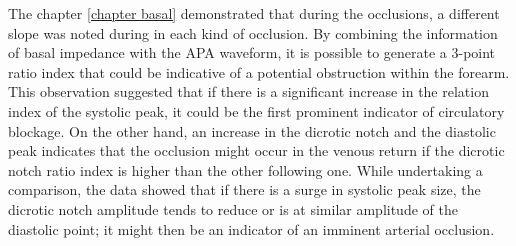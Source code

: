 The chapter \ref{chapter basal} demonstrated that during the occlusions, a different slope was noted during in each kind of occlusion. By combining the information of basal impedance with the APA waveform, it is possible to generate a 3-point ratio index that could be indicative of a potential obstruction within the forearm. This observation suggested that if there is a significant increase in the relation index of the systolic peak, it could be the first prominent indicator of circulatory blockage. On the other hand, an increase in the dicrotic notch and the diastolic peak indicates that the occlusion might occur in the venous return if the dicrotic notch ratio index is higher than the other following one. While undertaking a comparison, the data showed that if there is a surge in systolic peak size, the dicrotic notch amplitude tends to reduce or is at similar amplitude of the diastolic point; it might then be an indicator of an imminent arterial occlusion.





